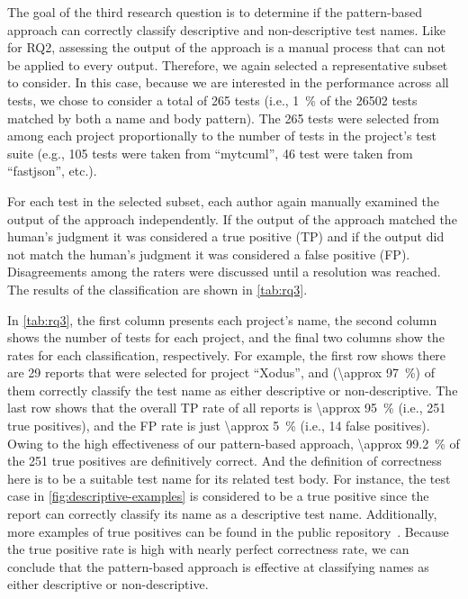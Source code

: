 \documentclass[proposal.tex]{subfiles}
\begin{document}
The goal of the third research question is to determine if the pattern-based approach can correctly classify descriptive and non-descriptive test names.
%
Like for RQ2, assessing the output of the approach is a manual process that can not be applied to every output.
%
Therefore, we again selected a representative subset to consider.
%
In this case, because we are interested in the performance across all tests, we chose to consider a total of  \num{265} tests (i.e., \SI{1}{\percent} of the \num{26502} tests matched by both a name and body pattern).
%
The \num{265} tests were selected from among each project proportionally to the number of tests in the project's test suite (e.g., \num{105} tests were taken from \enquote{mytcuml}, \num{46} test were taken from \enquote{fastjson}, etc.).


For each test in the selected subset, each author again manually examined the output of the approach independently.
%
If the output of the approach matched the human's judgment it was considered a true positive (TP) and if the output did not match the human's judgment it was considered a false positive (FP).
%
Disagreements among the raters were discussed until a resolution was reached.
%
The results of the classification are shown in \cref{tab:rq3}.


In \cref{tab:rq3}, the first column presents each project’s name, the second column shows the number of tests for each project, and the final two columns show the rates for each classification, respectively.
For example, the first row shows there are \num{29} reports that were selected for project \enquote{Xodus}, and (\SI{\approx 97}{\percent}) of them correctly classify the test name as either descriptive or non-descriptive.
%
The last row shows that the overall TP rate of all reports is \SI{\approx 95}{\percent} (i.e., \num{251} true positives), and the FP rate is just \SI{\approx 5}{\percent} (i.e., \num{14} false positives).
%
Owing to the high effectiveness of our pattern-based approach, \SI{\approx 99.2}{\percent} of the \num{251} true positives are definitively correct.
%
And the definition of correctness here is to be a suitable test name for its related test body.
%
For instance, the test case in \cref{fig:descriptive-examples} is considered to be a true positive since the report can correctly classify its name as a descriptive test name.
%
Additionally, more examples of true positives can be found in the public repository~\cite{prototype}.
%
Because the true positive rate is high with nearly perfect correctness rate, we can conclude that the pattern-based approach is effective at classifying names as either descriptive or non-descriptive.
\end{document}
